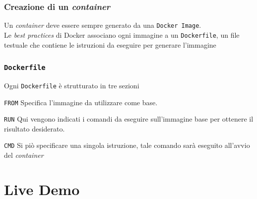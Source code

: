 \documentclass{beamer}
\begin{document}
\begin{frame}
\frametitle{Creazione di un \textit{container}}
Un  \textit{container} deve essere sempre generato da una \texttt{Docker Image}.\\
Le  \textit{best practices} di Docker associano ogni immagine a un \texttt{Dockerfile}, un file testuale che contiene le istruzioni da eseguire per generare l'immagine
\end{frame}

\begin{frame}
\frametitle{\texttt{Dockerfile}}
Ogni \texttt{Dockerfile} è strutturato in tre sezioni
\begin{block}{ \texttt{FROM}}
Specifica l'immagine da utilizzare come base.
\end{block}

\begin{block}{\texttt{RUN}}
Qui vengono indicati i comandi da eseguire sull'immagine base per ottenere il risultato desiderato.
\end{block}

\begin{block}{\texttt{CMD}}
Si piò specificare una singola istruzione, tale comando sarà eseguito all'avvio del \textit{container}
\end{block}
\end{frame}




\section{Live Demo}
\end{document}
